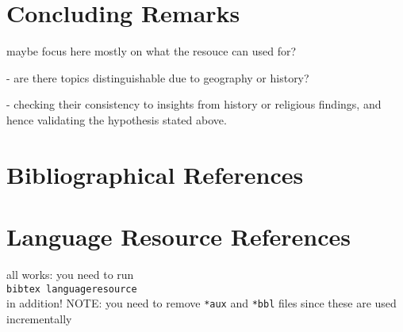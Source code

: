 \documentclass[a4paper,10pt]{article}
\newcommand{\TODO}[1]{\begingroup\color{red}#1\endgroup}
\begin{document}
\section{Concluding Remarks} 

\TODO{maybe focus here mostly on what the resouce can used for?} 

\TODO{- are there topics distinguishable due to geography or history?}

\TODO{- checking their consistency to insights from history or religious findings, and hence validating the hypothesis stated above.}



\section{Bibliographical References}
\label{main:ref}





\section{Language Resource References}
\label{lr:ref}

\TODO{all works: you need to run\\
\texttt{bibtex languageresource}\\
 in addition! NOTE: you need to remove 
\texttt{*aux} and \texttt{*bbl} files since these are used incrementally }

\end{document}
